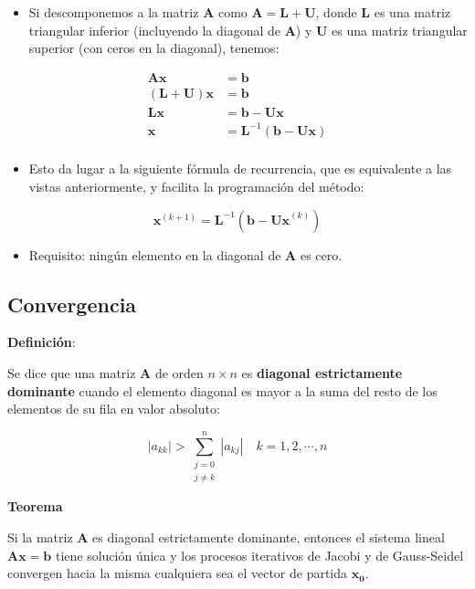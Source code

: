 \documentclass[]{book}
\providecommand{\tightlist}{%
  \setlength{\itemsep}{0pt}\setlength{\parskip}{0pt}}
\begin{document}
\begin{itemize}
\tightlist
\item
  Si descomponemos a la matriz \(\mathbf{A}\) como \(\mathbf{A=L+U}\), donde \(\mathbf{L}\) es una matriz triangular inferior (incluyendo la diagonal de \(\mathbf{A}\)) y \(\mathbf{U}\) es una matriz triangular superior (con ceros en la diagonal), tenemos:
\end{itemize}

\begin{align*} 
\mathbf{Ax} &= \mathbf{b} \\
\mathbf{(L+U)x} &= \mathbf{b} \\
\mathbf{Lx} &= \mathbf{b} - \mathbf{Ux}  \\
\mathbf{x} &= \mathbf{L}^{-1} (\mathbf{b} - \mathbf{Ux})  \\
\end{align*}

\begin{itemize}
\tightlist
\item
  Esto da lugar a la siguiente fórmula de recurrencia, que es equivalente a las vistas anteriormente, y facilita la programación del método:
\end{itemize}

\[
\mathbf{x}^{(k+1)} = \mathbf{L}^{-1} (\mathbf{b} - \mathbf{Ux}^{(k)}) 
\]

\begin{itemize}
\tightlist
\item
  Requisito: ningún elemento en la diagonal de \(\mathbf{A}\) es cero.
\end{itemize}

\hypertarget{convergencia-1}{%
\subsection{Convergencia}\label{convergencia-1}}

\textbf{Definición}:

Se dice que una matriz \(\mathbf{A}\) de orden \(n \times n\) es \textbf{diagonal estrictamente dominante} cuando el elemento diagonal es mayor a la suma del resto de los elementos de su fila en valor absoluto:

\[
|a_{kk}| > \sum\limits_{\substack{j=0 \\ j\neq k}}^n |a_{kj}| \quad k=1, 2, \cdots, n
\]

\textbf{Teorema}

Si la matriz \(\mathbf{A}\) es diagonal estrictamente dominante, entonces el sistema lineal \(\mathbf{Ax=b}\) tiene solución única y los procesos iterativos de Jacobi y de Gauss-Seidel convergen hacia la misma cualquiera sea el vector de partida \(\mathbf{x_0}\).
\end{document}
